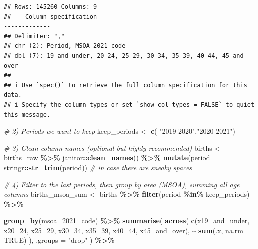 \documentclass[
]{article}
\newenvironment{Shaded}{\begin{snugshade}}{\end{snugshade}}
\newcommand{\AttributeTok}[1]{\textcolor[rgb]{0.13,0.29,0.53}{#1}}
\newcommand{\CommentTok}[1]{\textcolor[rgb]{0.56,0.35,0.01}{\textit{#1}}}
\newcommand{\ConstantTok}[1]{\textcolor[rgb]{0.56,0.35,0.01}{#1}}
\newcommand{\FunctionTok}[1]{\textcolor[rgb]{0.13,0.29,0.53}{\textbf{#1}}}
\newcommand{\NormalTok}[1]{#1}
\newcommand{\OtherTok}[1]{\textcolor[rgb]{0.56,0.35,0.01}{#1}}
\newcommand{\SpecialCharTok}[1]{\textcolor[rgb]{0.81,0.36,0.00}{\textbf{#1}}}
\newcommand{\StringTok}[1]{\textcolor[rgb]{0.31,0.60,0.02}{#1}}
\begin{document}
\begin{verbatim}
## Rows: 145260 Columns: 9
## -- Column specification --------------------------------------------------------
## Delimiter: ","
## chr (2): Period, MSOA 2021 code
## dbl (7): 19 and under, 20-24, 25-29, 30-34, 35-39, 40-44, 45 and over
## 
## i Use `spec()` to retrieve the full column specification for this data.
## i Specify the column types or set `show_col_types = FALSE` to quiet this message.
\end{verbatim}

\begin{Shaded}
\begin{Highlighting}[]
\CommentTok{\# 2) Periods we want to keep }
\NormalTok{keep\_periods }\OtherTok{\textless{}{-}} \FunctionTok{c}\NormalTok{(}
  \StringTok{"2019{-}2020"}\NormalTok{,}\StringTok{"2020{-}2021"}\NormalTok{)}

\CommentTok{\# 3) Clean column names (optional but highly recommended)}
\NormalTok{births }\OtherTok{\textless{}{-}}\NormalTok{ births\_raw }\SpecialCharTok{\%\textgreater{}\%}
\NormalTok{  janitor}\SpecialCharTok{::}\FunctionTok{clean\_names}\NormalTok{() }\SpecialCharTok{\%\textgreater{}\%}
  \FunctionTok{mutate}\NormalTok{(}\AttributeTok{period =}\NormalTok{ stringr}\SpecialCharTok{::}\FunctionTok{str\_trim}\NormalTok{(period))  }\CommentTok{\# in case there are sneaky spaces}

\CommentTok{\# 4) Filter to the last periods, then group by area (MSOA), summing all age columns}
\NormalTok{births\_msoa\_sum }\OtherTok{\textless{}{-}}\NormalTok{ births }\SpecialCharTok{\%\textgreater{}\%}
  \FunctionTok{filter}\NormalTok{(period }\SpecialCharTok{\%in\%}\NormalTok{ keep\_periods) }\SpecialCharTok{\%\textgreater{}\%}
  
  \FunctionTok{group\_by}\NormalTok{(msoa\_2021\_code) }\SpecialCharTok{\%\textgreater{}\%}
  \FunctionTok{summarise}\NormalTok{(}
    \FunctionTok{across}\NormalTok{(}
      \FunctionTok{c}\NormalTok{(}\StringTok{\textasciigrave{}}\AttributeTok{x19\_and\_under}\StringTok{\textasciigrave{}}\NormalTok{, }\StringTok{\textasciigrave{}}\AttributeTok{x20\_24}\StringTok{\textasciigrave{}}\NormalTok{, }\StringTok{\textasciigrave{}}\AttributeTok{x25\_29}\StringTok{\textasciigrave{}}\NormalTok{, }\StringTok{\textasciigrave{}}\AttributeTok{x30\_34}\StringTok{\textasciigrave{}}\NormalTok{, }\StringTok{\textasciigrave{}}\AttributeTok{x35\_39}\StringTok{\textasciigrave{}}\NormalTok{, }\StringTok{\textasciigrave{}}\AttributeTok{x40\_44}\StringTok{\textasciigrave{}}\NormalTok{, }\StringTok{\textasciigrave{}}\AttributeTok{x45\_and\_over}\StringTok{\textasciigrave{}}\NormalTok{),}
      \SpecialCharTok{\textasciitilde{}} \FunctionTok{sum}\NormalTok{(.x, }\AttributeTok{na.rm =} \ConstantTok{TRUE}\NormalTok{)}
\NormalTok{    ),}
    \AttributeTok{.groups =} \StringTok{"drop"}
\NormalTok{  ) }\SpecialCharTok{\%\textgreater{}\%}
  

\end{Highlighting}
\end{Shaded}
\end{document}

